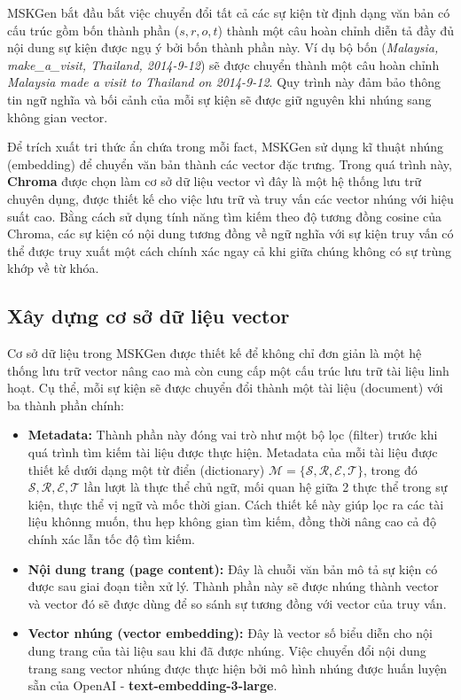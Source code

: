 MSKGen bắt đầu bắt việc chuyển đổi tất cả các sự kiện từ định dạng văn bản có cấu trúc gồm bốn thành phần ($s, r, o, t$) thành một câu hoàn chỉnh diễn tả đầy đủ nội dung sự kiện được ngụ ý bởi bốn thành phần này. Ví dụ bộ bốn (\textit{Malaysia, make\_a\_visit, Thailand, 2014-9-12}) sẽ được chuyển thành một câu hoàn chỉnh \textit{Malaysia made a visit to Thailand on 2014-9-12}. Quy trình này đảm bảo thông tin ngữ nghĩa và bối cảnh của mỗi sự kiện sẽ được giữ nguyên khi nhúng sang không gian vector.

Để trích xuất tri thức ẩn chứa trong mỗi fact, MSKGen sử dụng kĩ thuật nhúng (embedding) để chuyển văn bản thành các vector đặc trưng. Trong quá trình này, \textbf{Chroma} được chọn làm cơ sở dữ liệu vector vì đây là một hệ thống lưu trữ chuyên dụng, được thiết kế cho việc lưu trữ và truy vấn các vector nhúng với hiệu suất cao. Bằng cách sử dụng tính năng tìm kiếm theo độ tương đồng cosine của Chroma, các sự kiện có nội dung tương đồng về ngữ nghĩa với sự kiện truy vấn có thể được truy xuất một cách chính xác ngay cả khi giữa chúng không có sự trùng khớp về từ khóa.

\vspace{1em}
\subsection{Xây dựng cơ sở dữ liệu vector}

Cơ sở dữ liệu trong MSKGen được thiết kế để không chỉ đơn giản là một hệ thống lưu trữ vector nâng cao mà còn cung cấp một cấu trúc lưu trữ tài liệu linh hoạt. Cụ thể, mỗi sự kiện sẽ được chuyển đổi thành một tài liệu (document) với ba thành phần chính:
\begin{itemize}
    \item \textbf{Metadata:} Thành phần này đóng vai trò như một bộ lọc (filter) trước khi quá trình tìm kiếm tài liệu được thực hiện. Metadata của mỗi tài liệu được thiết kế dưới dạng một từ điển (dictionary) $\mathcal{M} = \{\mathcal{S, R, E, T}\}$, trong đó $\mathcal{S, R, E, T}$ lần lượt là thực thể chủ ngữ, mối quan hệ giữa 2 thực thể trong sự kiện, thực thể vị ngữ và mốc thời gian. Cách thiết kế này giúp lọc ra các tài liệu khônng muốn, thu hẹp không gian tìm kiếm, đồng thời nâng cao cả độ chính xác lẫn tốc độ tìm kiếm.
    \item \textbf{Nội dung trang (page content):} Đây là chuỗi văn bản mô tả sự kiện có được sau giai đoạn tiền xử lý. Thành phần này sẽ được nhúng thành vector và vector đó sẽ được dùng để so sánh sự tương đồng với vector của truy vấn.
    \item \textbf{Vector nhúng (vector embedding):} Đây là vector số biểu diễn cho nội dung trang của tài liệu sau khi đã được nhúng. Việc chuyển đổi nội dung trang sang vector nhúng được thực hiện bởi mô hình nhúng được huấn luyện sẵn của OpenAI - \textbf{text-embedding-3-large}.
\end{itemize}

